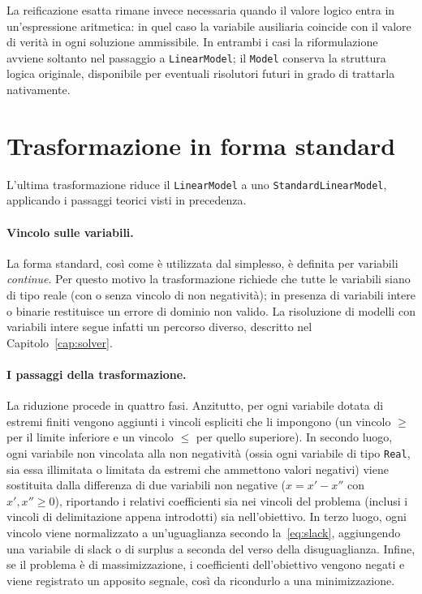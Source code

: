 La reificazione esatta rimane invece necessaria quando il valore logico entra
in un'espressione aritmetica: in quel caso la variabile ausiliaria coincide con
il valore di verità in ogni soluzione ammissibile. In entrambi i casi la
riformulazione avviene soltanto nel passaggio a \texttt{LinearModel}; il
\texttt{Model} conserva la struttura logica originale, disponibile per
eventuali risolutori futuri in grado di trattarla nativamente.

\section{Trasformazione in forma standard}
\label{sec:forma-standard}

L'ultima trasformazione riduce il \texttt{LinearModel} a uno
\texttt{StandardLinearModel}, applicando i passaggi teorici visti in precedenza.

\paragraph{Vincolo sulle variabili.}
La forma standard, così come è utilizzata dal simplesso, è definita per
variabili \emph{continue}. Per questo motivo la trasformazione richiede che
tutte le variabili siano di tipo reale (con o senza vincolo di non negatività);
in presenza di variabili intere o binarie restituisce un errore di dominio non
valido. La risoluzione di modelli con variabili intere segue infatti un percorso
diverso, descritto nel Capitolo~\ref{cap:solver}.

\paragraph{I passaggi della trasformazione.}
La riduzione procede in quattro fasi. Anzitutto, per ogni variabile dotata di
estremi finiti vengono aggiunti i vincoli espliciti che li impongono (un vincolo
$\ge$ per il limite inferiore e un vincolo $\le$ per quello superiore). In
secondo luogo, ogni variabile non vincolata alla non negatività (ossia ogni
variabile di tipo \texttt{Real}, sia essa illimitata o limitata da estremi che
ammettono valori negativi) viene sostituita dalla differenza di due variabili
non negative ($x = x' - x''$ con $x', x'' \ge 0$), riportando i relativi
coefficienti sia nei vincoli del problema (inclusi i vincoli di delimitazione
appena introdotti) sia nell'obiettivo. In terzo luogo, ogni vincolo viene
normalizzato a un'uguaglianza secondo la~\eqref{eq:slack}, aggiungendo una
variabile di slack o di surplus a seconda del verso della disuguaglianza.
Infine, se il problema è di massimizzazione, i coefficienti dell'obiettivo
vengono negati e viene registrato un apposito segnale, così da ricondurlo a una
minimizzazione.

